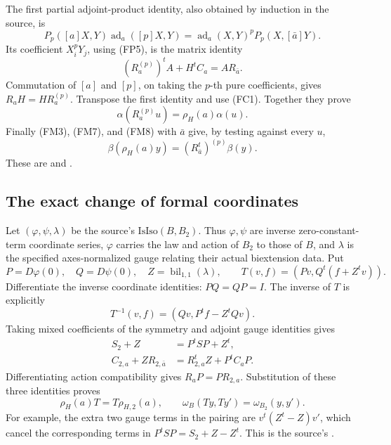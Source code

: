 The first partial adjoint-product identity, also obtained
by induction in the source, is
\[
 P_p([a]X,Y)\operatorname{ad}_a([p]X,Y)
       =\operatorname{ad}_a(X,Y)^p P_p(X,[\bar a]Y).
\]
Its coefficient \(X_i^pY_j\), using (FP5), is the matrix
identity
\[
                (R_a^{(p)})^tA+H^tC_a=AR_{\bar a}.
\]
Commutation of \([a]\) and \([p]\), on taking the
\(p\)-th pure coefficients, gives
\(R_aH=HR_a^{(p)}\).
Transpose the first identity and use (FC1).
Together they prove
\[
             \alpha(R_a^{(p)}u)=\rho_H(a)\alpha(u).
 \tag{FM8}\label{eq:faithful-alpha-action}
\]
Finally (FM3), (FM7), and (FM8) with \(\bar a\)
give, by testing against every \(u\),
\[
                \beta(\rho_H(a)y)
                           =(R_{\bar a}^t)^{(p)}\beta(y).
 \tag{FM9}\label{eq:faithful-beta-action}
\]
These are  and
.

\subsection{The exact change of formal coordinates}
\label{subsec:faithful-alpha-beta-coordinate-change}

Let \((\varphi,\psi,\lambda)\) be the source's
\(\mathrm{IsIso}(B,B_2)\).
Thus \(\varphi,\psi\) are inverse zero-constant-term
coordinate series, \(\varphi\) carries the law and action
of \(B_2\) to those of \(B\), and \(\lambda\) is the
specified axes-normalized gauge relating their actual
biextension data.
Put
\[
 P=D\varphi(0),\quad Q=D\psi(0),\quad
 Z=\operatorname{bil}_{1,1}(\lambda),\qquad
 T(v,f)=(Pv,Q^t(f+Z^tv)).
 \tag{FM10}\label{eq:faithful-T-coordinate}
\]
Differentiate the inverse coordinate identities:
\(PQ=QP=I\).
The inverse of \(T\) is explicitly
\[
                         T^{-1}(v,f)=(Qv,P^tf-Z^tQv).
\]
Taking mixed coefficients of the symmetry and adjoint
gauge identities gives
\[
 \begin{split}
 S_2+Z&=P^tSP+Z^t,\\
 C_{2,a}+ZR_{2,\bar a}
                 &=R_{2,a}^tZ+P^tC_aP.
 \end{split}
 \tag{FM11}\label{eq:faithful-gauge-coefficients}
\]
Differentiating action compatibility gives
\(R_aP=PR_{2,a}\).
Substitution of these three identities proves
\[
                  \rho_H(a)T=T\rho_{H,2}(a),\qquad
                     \omega_B(Ty,Ty')=\omega_{B_2}(y,y').
 \tag{FM12}\label{eq:faithful-T-action-pairing}
\]
For example, the extra two gauge terms in the pairing
are \(v^t(Z^t-Z)v'\), which cancel the corresponding
terms in \(P^tSP=S_2+Z-Z^t\).
This is the source's .


